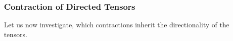 \subsubsection{Contraction of Directed Tensors}

Let us now investigate, which contractions inherit the directionality of the tensors.













